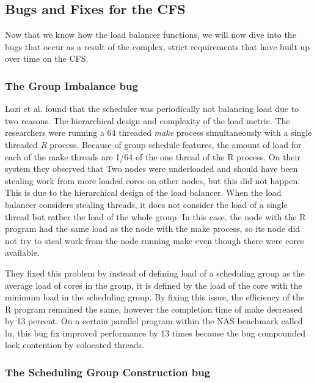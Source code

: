 \documentclass{sig-alternate}
\begin{document}
\subsection{Bugs and Fixes for the CFS}
\label{sec:cfsbugs}

Now that we know how the load balancer functions, we will now dive into the bugs that occur as a result of the complex, strict requirements that have built up over time on the CFS.

\subsubsection{The Group Imbalance bug}
\label{sec:cfsfault_grpimbalance}

Lozi et al. found that the scheduler was periodically not balancing load due to two reasons. The hierarchical design and complexity of the load metric. The researchers were running a 64 threaded \emph{make} process simultaneously with a single threaded \emph{R} process. Because of group schedule features, the amount of load for each of the make threads are 1/64 of the one thread of the R process. On their system they observed that Two nodes were underloaded and should have been stealing work from more loaded cores on other nodes, but this did not happen. This is due to the hierarchical design of the load balancer. When the load balancer considers stealing threads, it does not consider the load of a single thread but rather the load of the whole group. In this case, the node with the R program had the same load as the node with the make process, so its node did not try to steal work from the node running make even though there were cores available.~\cite{Lozi:2016}

They fixed this problem by instead of defining load of a scheduling group as the average load of cores in the group, it is defined by the load of the core with the minimum load in the scheduling group. By fixing this issue, the efficiency of the R program remained the same, however the completion time of make decreased by 13 percent. On a certain parallel program within the NAS benchmark called lu, this bug fix improved performance by 13 times because the bug compounded lock contention by colocated threads.~\cite{Lozi:2016}

\subsubsection{The Scheduling Group Construction bug}
\label{sec:cfsfault_grpconstruct}
\end{document}
